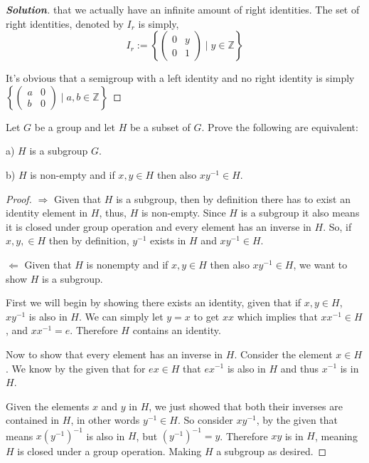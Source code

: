 \documentclass[11pt]{article}
\newenvironment{problem}[2][Problem\!]{\begin{trivlist}
\item[\hskip \labelsep {\bfseries #1}\hskip \labelsep {\bfseries #2}]}{\end{trivlist}}
\newenvironment{solution}{\begin{proof}[\textbf{\textit{Solution}}] }{\end{proof}}
\newcommand{\zz}{\mathbb Z}   %
\newcommand{\set}[1]{\left\{#1\right\}} %
\newcommand\m[1]{\begin{pmatrix}#1\end{pmatrix}}
\begin{document}
\begin{solution}
    that we actually have an infinite amount of right identities. The set of right identities, denoted by $I_r$ is simply,
    \[I_r := \set{\m{0 & y \\ 0 & 1} \mid y \in \zz}\]

    It's obvious that a semigroup with a left identity and no right identity is simply $\set{\m{a & 0 \\ b & 0}\mid a,b \in \zz}$
 \end{solution}

\begin{tcolorbox}
    \begin{problem}{2.3}
        Let $G$ be a group and let $H$ be a subset of $G$. Prove the following are equivalent:

        a) $H$ is a subgroup $G$.
        
        b) $H$ is non-empty and if $x,y\in H$ then also $xy^{-1}\in H$.
    \end{problem}
\end{tcolorbox}
\begin{proof}
    $\Rightarrow$ Given that $H$ is a subgroup, then by definition there has to exist an identity element in $H$, thus, $H$ is non-empty. Since $H$ is a subgroup it also means it is closed under group operation and every element has an inverse in $H$. So, if $x,y,\in H$ then by definition, $y^{-1}$ exists in $H$ and $xy^{-1} \in H$. 

    $\Leftarrow$ Given that $H$ is nonempty and if $x,y\in H$ then also $xy^{-1}\in H$, we want to show $H$ is a subgroup. 

    First we will begin by showing there exists an identity, given that if $x,y \in H$, $xy^{-1}$ is also in $H$. We can simply let $y=x$ to get $xx$ which implies that $xx^{-1}\in H$, and $xx^{-1}= e$. Therefore $H$ contains an identity.
    
    Now to show that every element has an inverse in $H$. Consider the element $x \in H$. We know by the given that for $ex\in H$ that $ex^{-1}$ is also in $H$ and thus $x^{-1}$ is in $H$.
    
    Given the elements $x$ and $y$ in $H$, we just showed that both their inverses are contained in $H$, in other words $y^{-1}\in H$. So consider $xy^{-1}$, by the given that means $x(y^{-1})^{-1}$ is also in $H$, but $(y^{-1})^{-1} = y$. Therefore $xy$ is in $H$, meaning $H$ is closed under a group operation. Making $H$ a subgroup as desired.
\end{proof}
\end{document}
